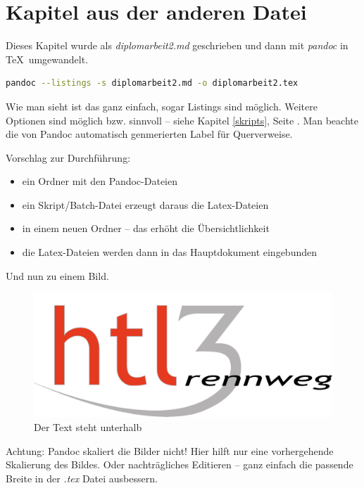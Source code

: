 \section{Kapitel aus der anderen
Datei}\label{kapitel-aus-der-anderen-datei}

Dieses Kapitel wurde als \emph{diplomarbeit2.md} geschrieben und dann
mit \emph{pandoc} in \TeX~umgewandelt.

\begin{lstlisting}[language=bash]
pandoc --listings -s diplomarbeit2.md -o diplomarbeit2.tex 
\end{lstlisting}

Wie man sieht ist das ganz einfach, sogar Listings sind möglich. Weitere
Optionen sind möglich bzw. sinnvoll -- siehe Kapitel \ref{skripts},
Seite \pageref{skripts}. Man beachte die von Pandoc automatisch
genmerierten Label für Querverweise.

Vorschlag zur Durchführung:

\begin{itemize}
\tightlist
\item
  ein Ordner mit den Pandoc-Dateien
\item
  ein Skript/Batch-Datei erzeugt daraus die Latex-Dateien
\item
  in einem neuen Ordner -- das erhöht die Übersichtlichkeit
\item
  die Latex-Dateien werden dann in das Hauptdokument eingebunden
\end{itemize}

Und nun zu einem Bild.

\begin{figure}[htbp]
\centering
\includegraphics{HTL3RLogo.png}
\caption{Der Text steht unterhalb}
\end{figure}

Achtung: Pandoc skaliert die Bilder nicht! Hier hilft nur eine
vorhergehende Skalierung des Bildes. Oder nachträgliches Editieren --
ganz einfach die passende Breite in der \emph{.tex} Datei ausbessern.

